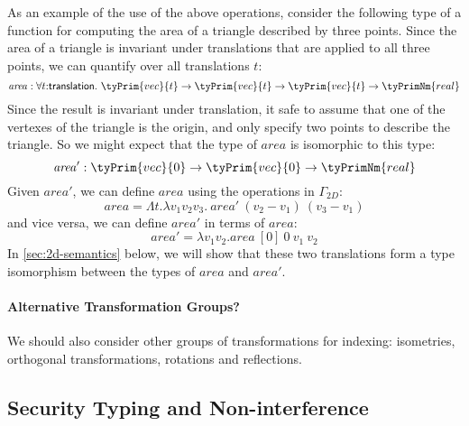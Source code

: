 As an example of the use of the above operations, consider the
following type of a function for computing the area of a triangle
described by three points. Since the area of a triangle is invariant
under translations that are applied to all three points, we can
quantify over all translations $t$:
\begin{displaymath}
  \mathit{area} : \forall t\mathord:\mathsf{translation}.\ \tyPrim{vec}{t} \to \tyPrim{vec}{t} \to \tyPrim{vec}{t} \to \tyPrimNm{real}
\end{displaymath}
Since the result is invariant under translation, it safe to assume
that one of the vertexes of the triangle is the origin, and only
specify two points to describe the triangle. So we might expect that
the type of $\mathit{area}$ is isomorphic to this type:
\begin{displaymath}
  \mathit{area'} : \tyPrim{vec}{0} \to \tyPrim{vec}{0} \to \tyPrimNm{real}
\end{displaymath}
Given $\mathit{area'}$, we can define $\mathit{area}$ using the
operations in $\Gamma_{\mathit{2D}}$:
\begin{displaymath}
  \mathit{area} = \Lambda t. \lambda v_1 v_2 v_3.\ \mathit{area'}\ (v_2 - v_1)\ (v_3 - v_1)
\end{displaymath}
and vice versa, we can define $\mathit{area'}$ in terms of
$\mathit{area}$:
\begin{displaymath}
  \mathit{area'} = \lambda v_1 v_2. \mathit{area}\ [0]\ 0\ v_1\ v_2
\end{displaymath}
In \autoref{sec:2d-semantics} below, we will show that these two
translations form a type isomorphism between the types of
$\mathit{area}$ and $\mathit{area'}$.

\paragraph{Alternative Transformation Groups?}
We should also consider other groups of transformations for indexing:
isometries, orthogonal transformations, rotations and reflections.

\subsection{Security Typing and Non-interference}


